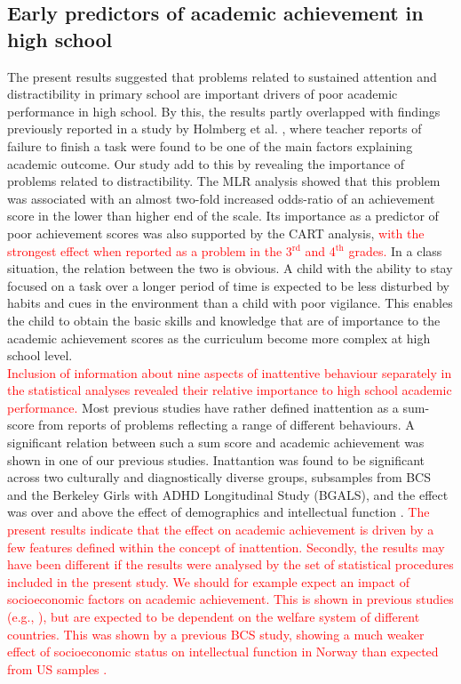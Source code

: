 \documentclass[10pt,letterpaper]{article}
\begin{document}
{{\subsection*{Early predictors of academic achievement in high school}
The present results suggested that problems related to sustained attention and distractibility in primary school are important drivers of poor academic performance in high school. By this, the results partly overlapped with findings previously reported in a study by Holmberg et al. \cite{Holmberg2014}, where  teacher reports of failure to finish a task were found to be one of the main factors explaining academic outcome. 
Our study add to this by revealing the importance of problems related to distractibility. The MLR analysis showed that this problem was associated with an almost two-fold increased odds-ratio of an achievement score in the lower than higher end of the scale. Its importance as a predictor of poor achievement scores was also supported by the CART analysis, \textcolor{red}{with the strongest effect when reported as a problem in the  3$^{\text{rd}}$ and 4$^{\text{th}}$ grades.}  In a class situation, the relation between the two is obvious. A child with the ability to stay focused on a task over a longer period of time is expected to be less disturbed by habits and cues in the environment than a child with poor vigilance.  This enables the child to obtain the basic skills and knowledge that are of importance to the academic achievement scores as the curriculum become more complex at high school level. \\

\textcolor{red}{Inclusion of information about nine aspects of inattentive behaviour separately in the statistical analyses revealed their relative importance to high school academic performance.} Most previous studies have rather defined inattention as a sum-score from reports of problems reflecting a range of different behaviours. A significant relation between such a sum score and academic achievement was shown in one of our previous studies. Inattantion was found to be significant across two culturally and diagnostically diverse groups, subsamples from BCS and the Berkeley Girls with ADHD Longitudinal Study (BGALS), and the effect was over and above the effect of demographics and intellectual function \cite{Lundervold2017}. \textcolor{red}{The present results indicate that the effect on academic achievement is driven by a few features defined within the concept of inattention. Secondly, the results may have been different if the results were analysed by the set of statistical procedures included in the present study. We should for example expect an impact of socioeconomic factors on academic achievement. This is shown in previous studies (e.g., \cite{Russel2015}), but are expected to be dependent on the welfare system of different countries. This was shown by a previous BCS study, showing a much weaker effect of socioeconomic status on intellectual function in Norway than expected from US samples \cite{Ellertsen2016}.}\\

}}
\end{document}
